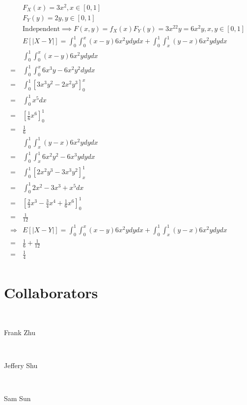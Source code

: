 \documentclass{article}
\begin{document}
~

\begin{align*}
    &F_X(x)=3x^2,x\in[0,1]\\
    &F_Y(y)=2y,y\in[0,1]\\
    &\text{Independent}\implies F(x,y)=f_X(x)F_Y(y)=3x^22y=6x^2y,x,y\in[0,1]\\
    &E[\left|X-Y\right|]=\int_{0}^{1}\int_{0}^{x}(x-y)6x^2y dydx+\int_{0}^{1}\int_{x}^{1}(y-x)6x^2y dydx\\
    &\int_{0}^{1}\int_{0}^{x}(x-y)6x^2y dydx\\
    =&\int_{0}^{1}\int_{0}^{x}6x^3y-6x^2y^2dydx\\
    =&\int_{0}^{1}\left[ 3x^3y^2-2x^2y^3\right]^{x}_{0}\\
    =&\int_{0}^{1}x^5dx\\
    =&\left[\frac{1}{6}x^6\right]^{1}_{0}\\
    =&\frac{1}{6}\\
    &\int_{0}^{1}\int_{x}^{1}(y-x)6x^2y dydx\\
    =&\int_{0}^{1}\int_{x}^{1}6x^2y^2-6x^3ydydx\\
    =&\int_{0}^{1}\left[2x^2y^3-3x^3y^2\right]^{1}_{x}\\
    =&\int_{0}^{1}2x^2-3x^3+x^5dx\\
    =&\left[\frac{2}{3}x^3-\frac{3}{4}x^4+\frac{1}{6}x^6\right]_{0}^{1}\\
    =&\frac{1}{12}\\
    \Rightarrow&E[\left|X-Y\right|]=\int_{0}^{1}\int_{0}^{x}(x-y)6x^2y dydx+\int_{0}^{1}\int_{x}^{1}(y-x)6x^2y dydx\\
    =&\frac{1}{6}+\frac{1}{12}\\
    =&\frac{1}{4}\\
\end{align*}

\newpage

\section*{Collaborators}

~

Frank Zhu

~

Jeffery Shu

~

Sam Sun
\end{document}
